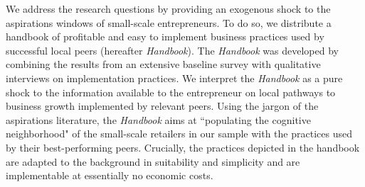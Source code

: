 \documentclass[11.5pt]{article}
\begin{document}

We address the research questions by providing an exogenous shock to the aspirations windows of small-scale entrepreneurs. To do so, we distribute a handbook of profitable and easy to implement business practices used by successful local peers (hereafter \emph{Handbook}). The \emph{Handbook} was developed by combining the results from an extensive baseline survey with qualitative interviews on implementation practices. We interpret the \emph{Handbook} as a pure shock to the information available to the entrepreneur on local pathways to business growth implemented by relevant peers. Using the jargon of the aspirations literature, the \emph{Handbook} aims at ``populating the cognitive neighborhood" of the small-scale retailers in our sample with the practices used by their best-performing peers. Crucially, the practices depicted in the handbook are adapted to the background in suitability and simplicity and are implementable at essentially no economic costs.
\end{document}
